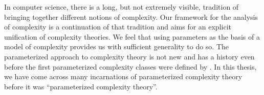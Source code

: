 \label{sec:conclusion:history}%

In computer science, there is a long, but not extremely visible, tradition of bringing together different notions of complexity.
Our framework for the analysis of complexity is a continuation of that tradition and aims for an explicit unification of complexity theories.
We feel that using parameters as the basis of a model of complexity provides us with sufficient generality to do so.
The parameterized approach to complexity theory is not new and has a history even before the first parameterized complexity classes were defined by \textcite{downey1992fixed}.
In this thesis, we have come across many incarnations of parameterized complexity theory before it was \enquote{parameterized complexity theory}.
\newcommand{\yeartextcite}[2][]{\citeyear{#2}\textmd{\textit{,~\textcite{#1,#2}.}}}
